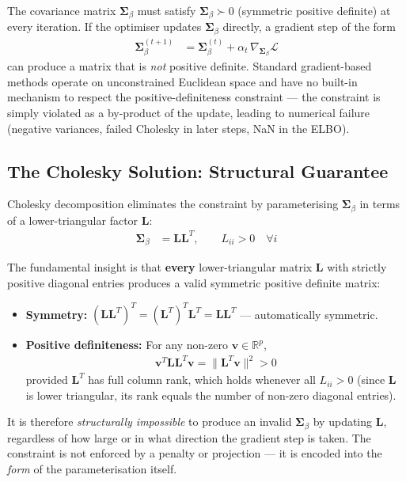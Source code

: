 \documentclass[11pt,a4paper]{article}
\newcommand{\R}{\mathbb{R}}
\begin{document}
The covariance matrix $\bm{\Sigma}_\beta$ must satisfy $\bm{\Sigma}_\beta \succ 0$ (symmetric positive definite) at every iteration. If the optimiser updates $\bm{\Sigma}_\beta$ directly, a gradient step of the form
\begin{align}
  \bm{\Sigma}_\beta^{(t+1)} &= \bm{\Sigma}_\beta^{(t)} + \alpha_t \,\nabla_{\bm{\Sigma}_\beta}\mathcal{L}
\end{align}
can produce a matrix that is \emph{not} positive definite. Standard gradient-based methods operate on unconstrained Euclidean space and have no built-in mechanism to respect the positive-definiteness constraint --- the constraint is simply violated as a by-product of the update, leading to numerical failure (negative variances, failed Cholesky in later steps, NaN in the ELBO).

\subsection*{The Cholesky Solution: Structural Guarantee}

Cholesky decomposition eliminates the constraint by parameterising $\bm{\Sigma}_\beta$ in terms of a lower-triangular factor $\bm{L}$:
\begin{align}
  \bm{\Sigma}_\beta &= \bm{L}\bm{L}^T, \qquad L_{ii} > 0 \quad \forall i
\end{align}

The fundamental insight is that \textbf{every} lower-triangular matrix $\bm{L}$ with strictly positive diagonal entries produces a valid symmetric positive definite matrix:

\begin{itemize}
  \item \textbf{Symmetry:} $(\bm{L}\bm{L}^T)^T = (\bm{L}^T)^T\bm{L}^T = \bm{L}\bm{L}^T$ \quad --- automatically symmetric.
  \item \textbf{Positive definiteness:} For any non-zero $\bm{v} \in \R^p$,
  \begin{align}
    \bm{v}^T \bm{L}\bm{L}^T \bm{v} = \|\bm{L}^T\bm{v}\|^2 > 0
  \end{align}
  provided $\bm{L}^T$ has full column rank, which holds whenever all $L_{ii} > 0$ (since $\bm{L}$ is lower triangular, its rank equals the number of non-zero diagonal entries).
\end{itemize}

It is therefore \emph{structurally impossible} to produce an invalid $\bm{\Sigma}_\beta$ by updating $\bm{L}$, regardless of how large or in what direction the gradient step is taken. The constraint is not enforced by a penalty or projection --- it is encoded into the \emph{form} of the parameterisation itself.
\end{document}
